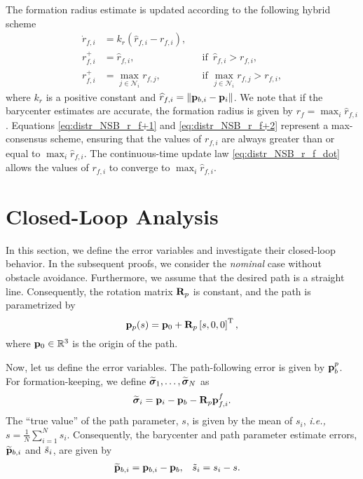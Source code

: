 The formation radius estimate is updated according to the following hybrid scheme
\begin{subequations}
    \begin{align}
        \dot{r}_{f, i} &= k_r \left(\widehat{r}_{f, i} - r_{f, i}\right),& &  \label{eq:distr_NSB_r_f_dot} \\
        r_{f, i}^{+} &= \widehat{r}_{f, i}, & &\text{if }\, \widehat{r}_{f, i} > r_{f, i}, \label{eq:distr_NSB_r_f+1} \\
        r_{f, i}^{+} &= \max_{j \in \mathcal{N}_i} r_{f, j}, & &\text{if } \max_{j \in \mathcal{N}_i} r_{f, j} > r_{f, i}, \label{eq:distr_NSB_r_f+2}
    \end{align}
\end{subequations}
where $k_r$ is a positive constant and $\widehat{r}_{f, i} = \left\|\mathbf{p}_{b, i} - \mathbf{p}_i\right\|$.
We note that if the barycenter estimates are accurate, the formation radius is given by $r_f = \max_i \widehat{r}_{f, i}$.
Equations \eqref{eq:distr_NSB_r_f+1} and \eqref{eq:distr_NSB_r_f+2} represent a max-consensus scheme, ensuring that the values of $r_{f, i}$ are always greater than or equal to $\max_i \widehat{r}_{f, i}$.
The continuous-time update law \eqref{eq:distr_NSB_r_f_dot} allows the values of $r_{f, i}$ to converge to $\max_i \widehat{r}_{f, i}$.

\section{Closed-Loop Analysis}
\label{sec:distr_NSB_closed_loop}
In this section, we define the error variables and investigate their closed-loop behavior.
In the subsequent proofs, we consider the \emph{nominal} case without obstacle avoidance.
Furthermore, we assume that the desired path is a straight line. %
Consequently, the rotation matrix $\mathbf{R}_p$ is constant, and the path is parametrized by
\begin{equation}
    \mathbf{p}_p(s) = \mathbf{p}_0 + \mathbf{R}_p \left[s, 0, 0\right]^{\mathrm{T}},
    \label{eq:distr_NSB_straight_line}
\end{equation}
where $\mathbf{p}_0 \in \mathbb{R}^3$ is the origin of the path.

Now, let us define the error variables.
The path-following error is given by $\mathbf{p}_b^p$.
For formation-keeping, we define $\widetilde{\bm{\sigma}}_1, \ldots, \widetilde{\bm{\sigma}}_N$ as
\begin{equation}
    \widetilde{\bm{\sigma}}_i = \mathbf{p}_i - \mathbf{p}_b - \mathbf{R}_p \mathbf{p}_{f, i}^f.
    \label{eq:distr_NSB_formation_errors}
\end{equation}    
The ``true value'' of the path parameter, $s$, is given by the mean of $s_i$, \emph{i.e.,} $s = \frac{1}{N} \sum_{i=1}^N s_i$.
Consequently, the barycenter and path parameter estimate errors, $\widetilde{\mathbf{p}}_{b, i}$ and $\Tilde{s}_{i}$, are given by
\begin{align}
    \widetilde{\mathbf{p}}_{b, i} &= \mathbf{p}_{b, i} - \mathbf{p}_b, &
    \Tilde{s}_{i} &= s_i - s. \label{eq:distr_NSB_consensus_errors}
\end{align}

